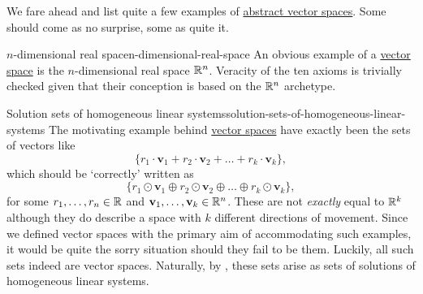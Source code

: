 We fare ahead and list quite a few examples of
\hyperref[def:abstract-vector-space]{abstract vector spaces}. Some should come
as no surprise, some as quite it.

\begin{example}{$n$-dimensional real space}{n-dimensional-real-space}
 An obvious example of a \hyperref[def:abstract-vector-space]{vector space} is
 the $n$-dimensional real space $\mathbb{R}^{n}$. Veracity of the ten axioms is
 trivially checked given that their conception is based on the $\mathbb{R}^{n}$
 archetype.
\end{example}

\begin{example}{Solution sets of homogeneous linear systems}{solution-sets-of-homogeneous-linear-systems}
 The motivating example behind \hyperref[def:abstract-vector-space]{vector
 spaces} have exactly been the sets of vectors like
 \[
  \{r_1 \cdot \mathbf{v}_1 + r_2 \cdot \mathbf{v}_2 + \ldots + r_k \cdot
  \mathbf{v}_k\},
 \]
 which should be `correctly' written as
 \[
  \{r_1 \odot \mathbf{v}_1 \oplus r_2 \odot \mathbf{v}_2 \oplus \ldots \oplus
  r_k \odot \mathbf{v}_k\},
 \]
 for some $r_1,\ldots,r_n \in \mathbb{R}$ and $\mathbf{v}_1,\ldots,\mathbf{v}_k \in
 \mathbb{R}^{n}$. These are not \emph{exactly} equal to $\mathbb{R}^{k}$ although they do
 describe a space with $k$ different directions of movement. Since we defined
 vector spaces with the primary aim of accommodating such examples, it would be
 quite the sorry situation should they fail to be them. Luckily, all such sets
 indeed are vector spaces. Naturally, by
 , these
 sets arise as sets of solutions of homogeneous linear systems.


\end{example}
